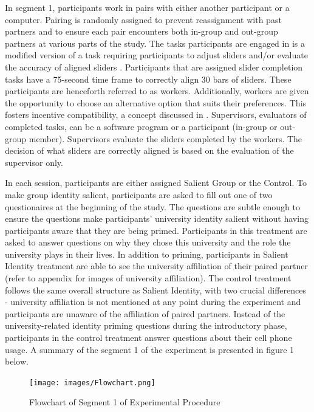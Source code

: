 In segment 1, participants work in pairs with either another participant or a computer. Pairing is randomly assigned to prevent reassignment with past partners and to ensure each pair encounters both in-group and out-group partners at various  parts of the study. The tasks participants are engaged in is a modified version of a task requiring participants to adjust sliders and/or evaluate the accuracy of aligned sliders \citep{gill2012}. Participants that are assigned slider completion tasks have a 75-second time frame to correctly align 30 bars of sliders. These participants are henceforth referred to as workers. Additionally, workers are given the opportunity to choose an alternative option that suits their preferences. This fosters incentive compatibility, a concept discussed in \cite{dutcher2015}. Supervisors, evaluators of completed tasks, can be a software program or a participant (in-group or out-group member). Supervisors evaluate the sliders completed by the workers. The decision of what sliders are correctly aligned is based on the evaluation of the supervisor only. 

In each session, participants are either assigned Salient Group or the Control. To make group identity salient, participants are asked to fill out one of two questionaires at the beginning of the study. The questions are subtle enough to ensure the questions make participants’ university identity salient without having participants aware that they are being primed. Participants in this treatment are asked to answer questions on why they chose this university and the role the university plays in their lives. In addition to priming, participants in Salient Identity treatment are able to see the university affiliation of their paired partner (refer to appendix for images of university affiliation). The control treatment follows the same overall structure as Salient Identity, with two crucial differences - university affiliation is not mentioned at any point during the experiment and participants are unaware of the affiliation of paired partners. Instead of the university-related identity priming questions during the introductory phase, participants in the control treatment answer questions about their cell phone usage. A summary of the segment 1 of the experiment is presented in figure 1 below. 

\begin{figure}[H]
 \captionsetup{justification=raggedright,singlelinecheck=false}
\caption{Flowchart of Segment 1 of Experimental Procedure}
\texttt{[image: images/Flowchart.png]} 
\end{figure}
 

